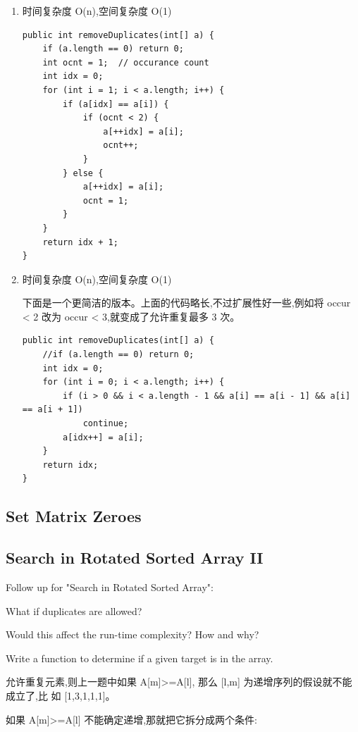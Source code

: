 \documentclass[12pt]{book}
\begin{document}
\begin{enumerate}
\item 时间复杂度 O(n),空间复杂度 O(1)
\label{sec-1-2-1-1}
\lstset{language=java,label= ,caption= ,numbers=none}
\begin{lstlisting}
public int removeDuplicates(int[] a) {
    if (a.length == 0) return 0;
    int ocnt = 1;  // occurance count
    int idx = 0;
    for (int i = 1; i < a.length; i++) {
        if (a[idx] == a[i]) {
            if (ocnt < 2) {
                a[++idx] = a[i];
                ocnt++;
            }
        } else {
            a[++idx] = a[i];
            ocnt = 1;
        }
    }
    return idx + 1;
}
\end{lstlisting}
\item 时间复杂度 O(n),空间复杂度 O(1)
\label{sec-1-2-1-2}

下面是一个更简洁的版本。上面的代码略长,不过扩展性好一些,例如将 occur < 2 改为
occur < 3,就变成了允许重复最多 3 次。

\lstset{language=java,label= ,caption= ,numbers=none}
\begin{lstlisting}
public int removeDuplicates(int[] a) {
    //if (a.length == 0) return 0;
    int idx = 0;
    for (int i = 0; i < a.length; i++) {
        if (i > 0 && i < a.length - 1 && a[i] == a[i - 1] && a[i] == a[i + 1])
            continue;
        a[idx++] = a[i];
    }
    return idx;
}
\end{lstlisting}
\end{enumerate}
\subsection{Set Matrix Zeroes}
\label{sec-1-2-2}

\subsection{Search in Rotated Sorted Array II}
\label{sec-1-2-3}
Follow up for "Search in Rotated Sorted Array":

What if duplicates are allowed?

Would this affect the run-time complexity? How and why?

Write a function to determine if a given target is in the array.

允许重复元素,则上一题中如果 A[m]>=A[l], 那么 [l,m] 为递增序列的假设就不能成立了,比
如 [1,3,1,1,1]。

如果 A[m]>=A[l] 不能确定递增,那就把它拆分成两个条件:
\end{document}
